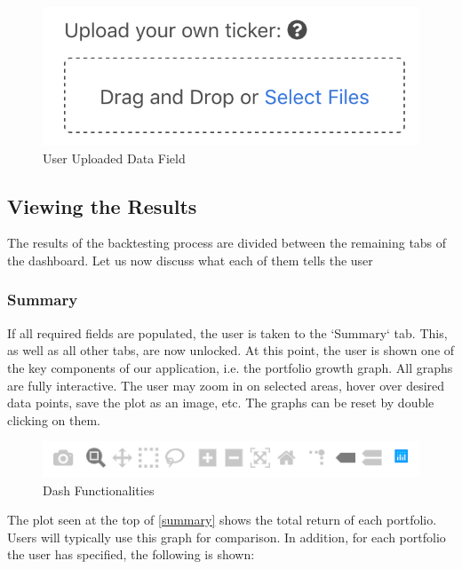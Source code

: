 \documentclass[main.tex]{subfiles}
\begin{document}
\begin{figure}[H]
   \centering
   \includegraphics[scale=0.8]{08Appendices/081User/081Pictures/user_csv_alt.png}
   \caption{User Uploaded Data Field}
\end{figure}

\subsection{Viewing the Results}

The results of the backtesting process are divided between the remaining tabs of the dashboard. Let us now discuss what each of them tells the user

\subsubsection{Summary}

If all required fields are populated, the user is taken to the `Summary` tab. This, as well as all other tabs, are now unlocked. At this point, the user is shown one of the key components of our application, i.e. the portfolio growth graph. All graphs are fully interactive. The user may zoom in on selected areas, hover over desired data points, save the plot as an image, etc. The graphs can be reset by double clicking on them.

\begin{figure}[H]
   \centering
   \includegraphics[width=\textwidth]{08Appendices/081User/081Pictures/dash_funcionalities.png}
   \caption{Dash Functionalities}
   \label{dash_functionalities}
\end{figure}

The plot seen at the top of \figurename{\ref{summary}} shows the total return of each portfolio. Users will typically use this graph for comparison. In addition, for each portfolio the user has specified, the following is shown:
\end{document}
